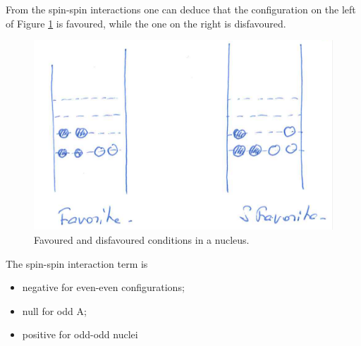 From the spin-spin interactions one can deduce that the configuration on the left of Figure \ref{nuclear-physics-fig:16} is favoured, while the one on the right is disfavoured.
\begin{figure}[h]
    \centering
    \includegraphics[scale=0.5]{Figures/nuclear-physics-fig16}
    \caption{Favoured and disfavoured conditions in a nucleus.}
    \label{nuclear-physics-fig:16}
\end{figure}
The spin-spin interaction term is
\begin{itemize}
    \item negative for even-even configurations;
    \item null for odd A;
    \item positive for odd-odd nuclei
\end{itemize}

